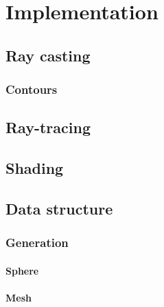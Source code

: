 \chapter{Implementation}
\label{implementation}

\section{Ray casting}

\subsection{Contours}

\section{Ray-tracing}

\section{Shading}

\section{Data structure}

\subsection{Generation}

\subsubsection{Sphere}

\subsubsection{Mesh}